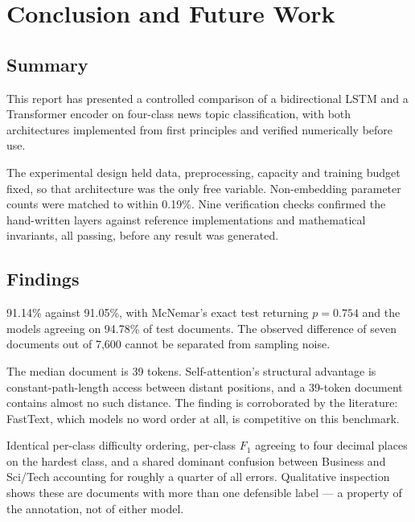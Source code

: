 \chapter{Conclusion and Future Work}
\label{ch:conclusion}

\section{Summary}

This report has presented a controlled comparison of a bidirectional LSTM and a Transformer encoder
on four-class news topic classification, with both architectures implemented from first principles
and verified numerically before use.

The experimental design held data, preprocessing, capacity and training budget fixed, so that
architecture was the only free variable. Non-embedding parameter counts were matched to within
0.19\%. Nine verification checks confirmed the hand-written layers against reference
implementations and mathematical invariants, all passing, before any result was generated.

\section{Findings}

91.14\% against 91.05\%, with McNemar's exact test returning $p = 0.754$ and the models agreeing on
94.78\% of test documents. The observed difference of seven documents out of 7{,}600 cannot be
separated from sampling noise.

 The median document is 39
tokens. Self-attention's structural advantage is constant-path-length access between distant
positions, and a 39-token document contains almost no such distance. The finding is corroborated by
the literature: FastText, which models no word order at all, is competitive on this benchmark.

 Identical per-class difficulty ordering,
per-class $F_1$ agreeing to four decimal places on the hardest class, and a shared
dominant confusion between Business and Sci/Tech accounting for roughly a quarter of all errors.
Qualitative inspection shows these are documents with more than one defensible label --- a property
of the annotation, not of either model.

